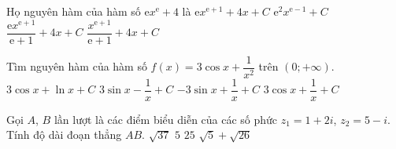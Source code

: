 \begin{ex}%
	Họ nguyên hàm của hàm số $\mathrm{e}x^\mathrm{e}+4$ là
	\choice
	{$\mathrm{e}{x}^{\mathrm{e}+1}+4x+C$}
	{$\mathrm{e}^2{x}^{\mathrm{e}-1}+C$}
	{\True $\dfrac{\mathrm{e}{x}^{\mathrm{e}+1}}{\mathrm{e}+1}+4x+C$}
	{$\dfrac{x^{\mathrm{e}+1}}{\mathrm{e}+1}+4x+C$}
\end{ex}


\begin{ex}%
	Tìm nguyên hàm của hàm số $f(x) = 3\cos x+\dfrac{1}{x^2}$ trên $(0;+\infty)$.
	\choice
	{$3\cos x+\ln x+C$}
	{\True $3\sin x-\dfrac{1}{x}+C$}
	{$-3\sin x+\dfrac{1}{x}+C$}
	{$3\cos x+\dfrac{1}{x}+C$}
\end{ex}


\begin{ex}%
	Gọi $A$, $B$ lần lượt là các điểm biểu diễn của các số phức $z_1= 1+2i$, $z_2 = 5-i$. Tính độ dài đoạn thẳng $AB$.
	\choice
	{$\sqrt {37} $}
	{\True $5$}
	{$25$}
	{$\sqrt 5+\sqrt {26} $}
\end{ex}


